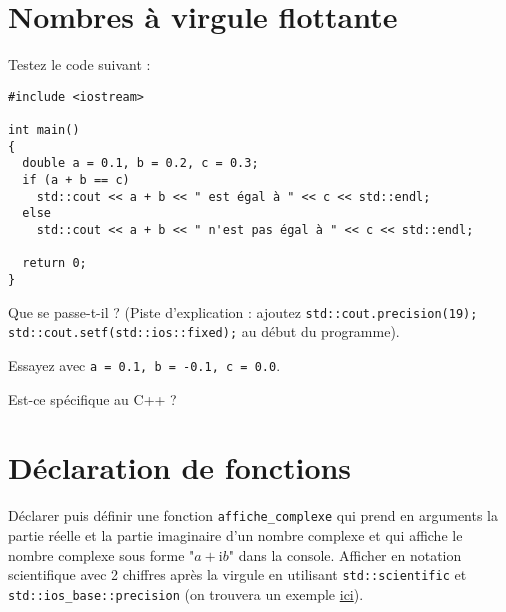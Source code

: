 \documentclass{book}
\newcommand{\inline}[1]{\texttt{#1}}
\begin{document}

\section{Nombres à virgule flottante}

Testez le code suivant :
\begin{verbatim}
#include <iostream>

int main()
{
  double a = 0.1, b = 0.2, c = 0.3;
  if (a + b == c) 
    std::cout << a + b << " est égal à " << c << std::endl;
  else
    std::cout << a + b << " n'est pas égal à " << c << std::endl;

  return 0;
}
\end{verbatim}

Que se passe-t-il ? (Piste d'explication : ajoutez \inline{std::cout.precision(19); std::cout.setf(std::ios::fixed);} au début du programme).

Essayez avec \inline{a = 0.1, b = -0.1, c = 0.0}.

Est-ce spécifique au C++ ?


\section{Déclaration de fonctions}

Déclarer puis définir une fonction \inline{affiche_complexe} qui prend en arguments la partie réelle et la partie imaginaire d'un nombre complexe et qui affiche le nombre complexe sous forme "$a+\mathrm{i}b$" dans la console. Afficher en notation scientifique avec 2 chiffres après la virgule en utilisant \inline{std::scientific} et \inline{std::ios_base::precision} (on trouvera un exemple \href{https://cplusplus.com/reference/ios/ios_base/precision/}{ici}).
\end{document}
